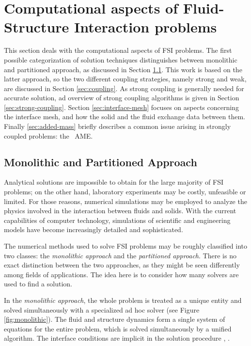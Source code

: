 \chapter{Computational aspects of Fluid-Structure Interaction problems}
\label{cha:computation}

This section deals with the computational aspects of FSI problems. The first possible categorization of solution techniques distinguishes between monolithic and partitioned approach, as discussed in Section \ref{sec:monolithic}. This work is based on the latter approach, so the two different coupling strategies, namely strong and weak, are discussed in Section \ref{sec:coupling}. As strong coupling is generally needed for accurate solution, ad overview of strong coupling algorithms is given in Section \ref{sec:strong-coupling}. Section \ref{sec:interface-mesh} focuses on aspects concerning the interface mesh, and how the solid and the fluid exchange data between them. Finally \ref{sec:added-mass} briefly describes a common issue arising in strongly coupled problems: the ~\ac{AME}.


\section{Monolithic and Partitioned Approach}
\label{sec:monolithic}

Analytical solutions are impossible to obtain for the large majority of FSI problems; on the other hand, laboratory experiments may be costly, unfeasible or limited. For those reasons, numerical simulations may be employed to analyze the physics involved in the interaction between fluids and solids. With the current capabilities of computer technology, simulations of scientific and engineering models have become increasingly detailed and sophisticated.

The numerical methods used to solve FSI problems may be roughly classified into two classes: the \textit{monolithic approach} and the \textit{partitioned approach}. There is no exact distinction between the two approaches, as they might be seen differently among fields of applications. The idea here is to consider how many solvers are used to find a solution.

In the \textit{monolithic approach}, the whole problem is treated as a unique entity and solved simultaneously with a specialized ad hoc solver (see Figure \ref{fig:monolithic}). The fluid and structure dynamics form a single system of equations for the entire problem, which is solved simultaneously by a unified algorithm. The interface conditions are implicit in the solution procedure \cite{hubner2004monolithic}, \cite{ryzhakov2010monolithic}.

